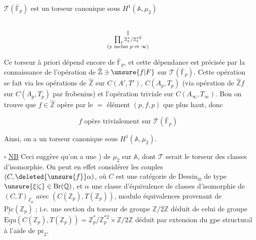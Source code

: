 
$\mathcal T(\bar{\mathbb F}_p)$ est un torseur canonique sous $H^1(\mathbb A,\mu_2)$

\[
\underset{\substack{\Vert\\\prod_\ell\mathbb Z_\ell^*/\mathbb Z_\ell^{*2}\\
\text{(y inclus $p$ et $\infty$)}}}{\vphantom{H^1(\mathbb A,\mu_2)}}
\]


Ce torseur à priori dépend encore de $\bar{\mathbb F}_p$,  et cette
dépendance est précisée par la connaissance de l'opération
de $\hat{\mathbb Z}\ni\unsure{f|F}$ sur $\mathcal T(\bar{\mathbb F}_p)$. Cette opération se fait via
les opérations de $\hat{\mathbb Z}$ sur $C(A',T')$,   $C(A_p,T_p)$
(via opération de $\hat{\mathbb Z}f$ sur $C(A_p,T_p)$ par frobenius) et
l'opération triviale sur $C(A_\infty,T_\infty)$. Bon on trouve que
$f\in\hat{\mathbb Z}$ opère par le $=$ élément $(p,f,p)$ que plus
haut, donc

\[
f\text{ opère trivialement sur }\mathcal T(\bar{\mathbb F}_p)
\]

Ainsi, on a un torseur canonique  sous $H^1(\mathbb A,\mu_2)$.

$\square$ \uline{NB} Ceci suggère qu'on a une  
) de  $\mu_2$ sur $\mathbb A$, dont $\mathcal T$ serait
le torseur des classes d'isomorphie. On peut
en effet considérer les couples $(C,\deleted{\unsure{f}}\alpha)$, où
$C$ est une catégorie de Dessin$_\otimes$ de type $\unsure{\xi|\zeta}\in\mathrm{Br}(\mathbb Q)$,  et
$\alpha$ une  classe d'équivalence de classes d'isomorphie
de  $(C,T)_{\mathbb Z_p}$ avec $(C(\mathbb Z_p),T(\mathbb Z_p))$, modulo équivalences
provenant de $\underline{\underline{\mathrm{Pic}}}(\mathbb Z_p)$ ; i.e. une section du torseur de
groupe $\mathbb Z/2\mathbb Z$ déduit de celui de groupe $\underline{\mathrm{Equ}}(C(\mathbb Z_p),T(\mathbb Z_p))=\mathbb Z_p^*/\mathbb Z_p^{*2}\times\mathbb Z/2\mathbb Z$
déduit par extension du gpe structural à l'aide de $\mathrm{pr}_2$.

